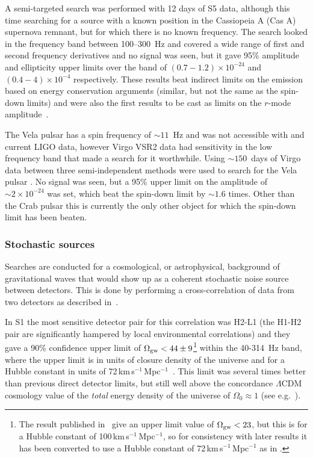 \documentclass{article}
\begin{document}
A semi-targeted search was performed with 12 days of S5 data, although this time
searching for a source with a known position in the Cassiopeia A (Cas A)
supernova remnant, but for which there is no known frequency. The search
\cite{Abadie:2010g} looked in the frequency band between 100--300~Hz and covered
a wide range of first and second frequency derivatives and no signal was seen,
but it gave 95\% amplitude and ellipticity upper limits over the band of
$(0.7-1.2)\times10^{-24}$ and $(0.4-4)\times10^{-4}$ respectively. These results
beat indirect limits on the emission based on energy conservation arguments
(similar, but not the same as the spin-down limits) and were also the first
results to be cast as limits on the $r$-mode amplitude~\cite{Owen:2010}.

The Vela pulsar has a spin frequency of $\sim11$~Hz and was not accessible with
and current LIGO data, however Virgo VSR2 data had sensitivity in the low
frequency band that made a search for it worthwhile. Using $\sim 150$~days of
Virgo data between three semi-independent methods were used to search for the
Vela pulsar \cite{Abadie:2011b}. No signal was seen, but a 95\% upper limit on
the amplitude of $\sim2\times10^{-24}$ was set, which beat the spin-down limit
by $\sim 1.6$ times. Other than the Crab pulsar this is currently the only other
object for which the spin-down limit has been beaten.

\subsubsection{Stochastic sources}

Searches are conducted for a cosmological, or astrophysical, background of
gravitational waves that would show up as a coherent stochastic noise source
between detectors. This is done by performing a cross-correlation of data from
two detectors as described in~\cite{Allen:1999b}.

In S1 the most sensitive detector pair for this correlation was H2-L1 (the H1-H2
pair are significantly hampered by local environmental correlations) and they
gave a 90\% confidence upper limit of $\Omega_{\rm gw} < 44\pm9$\footnote{The
result published in~\cite{Abbott:2004e} give an upper limit value of
$\Omega_{\rm gw} < 23$, but this is for a Hubble constant
of 100\,km\,s$^{-1}$\,Mpc$^{-1}$, so for consistency with later results it has
been converted to use a Hubble constant of 72\,km\,s$^{-1}$\,Mpc$^{-1}$ as in
\cite{Abbott:2005h}.} within the 40-314~Hz band, where the upper limit is in
units of closure density of the universe and for a Hubble constant in units of
72\,km\,s$^{-1}$\,Mpc$^{-1}$~\cite{Abbott:2004e}. This limit was several times
better than previous direct detector limits, but still well above the
concordance $\Lambda$CDM cosmology value of the \textit{total} energy density of
the universe of $\Omega_0\approx1$ (see e.g.~\cite{Jarosik:2010}).
\end{document}
